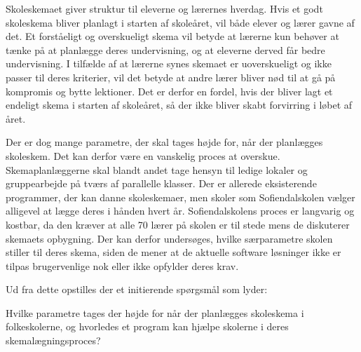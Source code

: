 Skoleskemaet giver struktur til eleverne og lærernes hverdag. Hvis et godt skoleskema bliver planlagt i starten af skoleåret, vil både elever og lærer gavne af det. Et forståeligt og overskueligt skema vil betyde at lærerne kun behøver at tænke på at planlægge deres undervisning, og at eleverne derved får bedre undervisning. I tilfælde af at lærerne synes skemaet er uoverskueligt og ikke passer til deres kriterier, vil det betyde at andre lærer bliver nød til at gå på kompromis og bytte lektioner. Det er derfor en fordel, hvis der bliver lagt et endeligt skema i starten af skoleåret, så der ikke bliver skabt forvirring i løbet af året.

Der er dog mange parametre, der skal tages højde for, når der planlægges skoleskem. Det kan derfor være en vanskelig proces at overskue. Skemaplanlæggerne skal blandt andet tage hensyn til ledige lokaler og gruppearbejde på tværs af parallelle klasser. Der er allerede eksisterende programmer, der kan danne skoleskemaer, men skoler som Sofiendalskolen vælger alligevel at lægge deres i hånden hvert år. Sofiendalskolens proces er langvarig og kostbar, da den kræver at alle 70 lærer på skolen er til stede mens de diskuterer skemaets opbygning. Der kan derfor undersøges, hvilke særparametre skolen stiller til deres skema, siden de mener at de aktuelle software løsninger ikke er tilpas brugervenlige nok eller ikke opfylder deres krav.

Ud fra dette opstilles der et initierende spørgsmål som lyder:

Hvilke parametre tages der højde for når der planlægges skoleskema i folkeskolerne, og hvorledes et program kan hjælpe skolerne i deres skemalægningsproces?
\newpage
